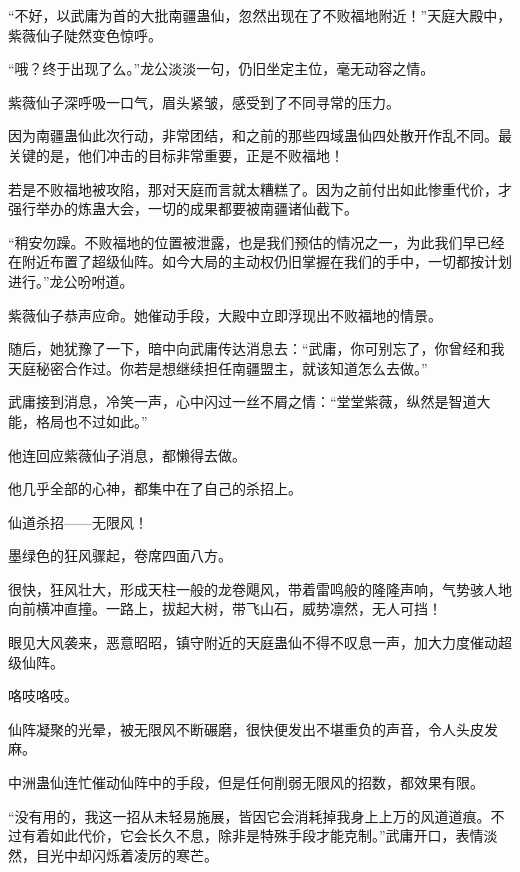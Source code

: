 
\begin{this_body}

“不好，以武庸为首的大批南疆蛊仙，忽然出现在了不败福地附近！”天庭大殿中，紫薇仙子陡然变色惊呼。

“哦？终于出现了么。”龙公淡淡一句，仍旧坐定主位，毫无动容之情。

紫薇仙子深呼吸一口气，眉头紧皱，感受到了不同寻常的压力。

因为南疆蛊仙此次行动，非常团结，和之前的那些四域蛊仙四处散开作乱不同。最关键的是，他们冲击的目标非常重要，正是不败福地！

若是不败福地被攻陷，那对天庭而言就太糟糕了。因为之前付出如此惨重代价，才强行举办的炼蛊大会，一切的成果都要被南疆诸仙截下。

“稍安勿躁。不败福地的位置被泄露，也是我们预估的情况之一，为此我们早已经在附近布置了超级仙阵。如今大局的主动权仍旧掌握在我们的手中，一切都按计划进行。”龙公吩咐道。

紫薇仙子恭声应命。她催动手段，大殿中立即浮现出不败福地的情景。

随后，她犹豫了一下，暗中向武庸传达消息去：“武庸，你可别忘了，你曾经和我天庭秘密合作过。你若是想继续担任南疆盟主，就该知道怎么去做。”

武庸接到消息，冷笑一声，心中闪过一丝不屑之情：“堂堂紫薇，纵然是智道大能，格局也不过如此。”

他连回应紫薇仙子消息，都懒得去做。

他几乎全部的心神，都集中在了自己的杀招上。

仙道杀招——无限风！

墨绿色的狂风骤起，卷席四面八方。

很快，狂风壮大，形成天柱一般的龙卷飓风，带着雷鸣般的隆隆声响，气势骇人地向前横冲直撞。一路上，拔起大树，带飞山石，威势凛然，无人可挡！

眼见大风袭来，恶意昭昭，镇守附近的天庭蛊仙不得不叹息一声，加大力度催动超级仙阵。

咯吱咯吱。

仙阵凝聚的光晕，被无限风不断碾磨，很快便发出不堪重负的声音，令人头皮发麻。

中洲蛊仙连忙催动仙阵中的手段，但是任何削弱无限风的招数，都效果有限。

“没有用的，我这一招从未轻易施展，皆因它会消耗掉我身上上万的风道道痕。不过有着如此代价，它会长久不息，除非是特殊手段才能克制。”武庸开口，表情淡然，目光中却闪烁着凌厉的寒芒。


\end{this_body}

